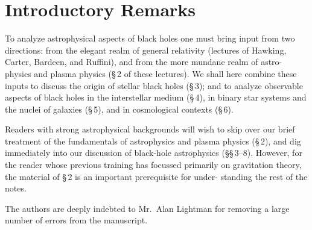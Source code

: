 
\section{Introductory Remarks}
\label{sec:1}%
To analyze astrophysical aspects of black holes one must bring input from two
directions: from the elegant realm of general relativity (lectures of Hawking,
Carter, Bardeen, and Ruffini), and from the more mundane realm of astro-
physics and plasma physics (\S\,2 of these lectures). We shall here combine these
inputs to discuss the origin of stellar black holes (\S\,3); and to analyze observable
aspects of black holes in the interstellar medium (\S\,4), in binary star systems and
the nuclei of galaxies (\S\,5), and in cosmological contexts (\S\,6).

Readers with strong astrophysical backgrounds will wish to skip over our
brief treatment of the fundamentals of astrophysics and plasma physics (\S\,2),
and dig immediately into our discussion of black-hole astrophysics (\S\S\,3--8).
However, for the reader whose previous training has focussed primarily on
gravitation theory, the material of \S\,2 is an important prerequisite for under-
standing the rest of the notes.

The authors are deeply indebted to Mr.\ Alan Lightman for removing a large
number of errors from the manuscript.
